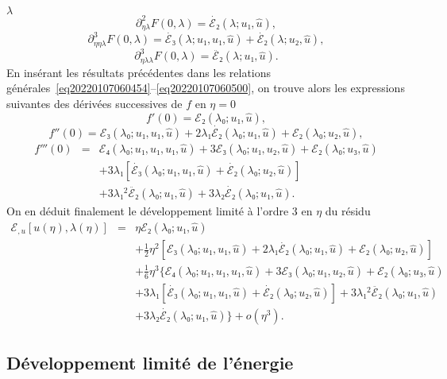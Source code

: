\documentclass[12pt, final]{amsart}
\theoremstyle{definition}
\begin{document}
$λ$
\begin{equation}
  \partial_{η  λ}^2 F (0, λ) = \dot{ℰ₂}
  (λ ; u₁, \hat{u}),
\end{equation}
\begin{equation}
  \partial_{η  η  λ}^3 F (0, λ) =
  \dot{ℰ₃} (λ ; u₁, u₁, \hat{u}) + \dot{ℰ₂}
  (λ ; u₂, \hat{u}),
\end{equation}
\begin{equation}
  \partial_{η  λ  λ}^3 F (0, λ) =
  \ddot{ℰ₂} (λ ; u₁, \hat{u}) .
\end{equation}
En insérant les résultats précédentes dans les relations
générales~\eqref{eq20220107060454}--\eqref{eq20220107060500}, on
trouve alors les expressions suivantes des dérivées successives de $f$
en $η = 0$
\begin{equation}
  f' (0) =ℰ₂ (λ₀ ; u₁, \hat{u}),
\end{equation}
\begin{equation}
  f'' (0) =ℰ₃ (λ₀ ; u₁, u₁, \hat{u}) + 2 λ₁
  \dot{ℰ₂} (λ₀ ; u₁, \hat{u}) +ℰ₂ (λ₀ ;
  u₂, \hat{u}),
\end{equation}
\begin{eqnarray}
  f''' (0) & = & ℰ₄ (λ₀ ; u₁, u₁, u₁, \hat{u}) +
  3ℰ₃ (λ₀ ; u₁, u₂, \hat{u}) +ℰ₂ (λ₀ ;
  u₃, \hat{u}) \nonumber\\
  &  &  + 3 λ₁  [\dot{ℰ₃} (λ₀ ; u₁, u₁,
  \hat{u}) + \dot{ℰ₂} (λ₀ ; u₂, \hat{u})] \nonumber\\
  &  &  + 3 λ₁^2  \ddot{ℰ₂} (λ₀ ; u₁,
  \hat{u}) + 3 λ₂  \dot{ℰ₂} (λ₀ ; u₁, \hat{u}) .
\end{eqnarray}
On en déduit finalement le développement limité à l'ordre 3 en
$η$ du résidu
\begin{eqnarray}
  ℰ_{, u} [u (η), λ (η)] & = & η ℰ₂
  (λ₀ ; u₁, \hat{u}) \nonumber\\
  &  &  + \tfrac{1}{2} η^2  [ℰ₃ (λ₀ ; u₁, u₁,
  \hat{u}) + 2 λ₁  \dot{ℰ₂} (λ₀ ; u₁, \hat{u})
  +ℰ₂ (λ₀ ; u₂, \hat{u})] \nonumber\\
  &  &  + \tfrac{1}{6} η^3  \{ ℰ₄ (λ₀ ; u₁,
  u₁, u₁, \hat{u}) + 3ℰ₃ (λ₀ ; u₁, u₂, \hat{u})
   +ℰ₂ (λ₀ ; u₃, \hat{u}) \nonumber\\
  &  &  + 3 λ₁  [\dot{ℰ₃} (λ₀ ; u₁, u₁,
  \hat{u}) + \dot{ℰ₂} (λ₀ ; u₂, \hat{u})] + 3 λ₁^2
  \ddot{ℰ₂} (λ₀ ; u₁, \hat{u}) \nonumber\\
  &  &   + 3 λ₂  \dot{ℰ₂} (λ₀ ;
  u₁, \hat{u}) \} + o (η^3) .  \label{eq20220107080901}
\end{eqnarray}
\subsection{Développement limité de l'énergie}\label{sec:DL
energie}
\end{document}
